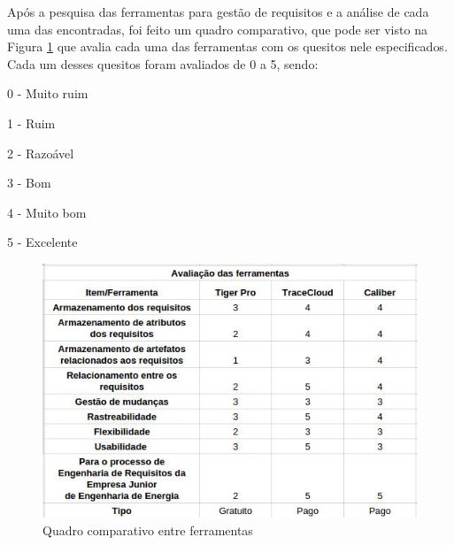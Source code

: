 Após a pesquisa das ferramentas para gestão de requisitos e a análise de cada uma das encontradas, foi feito um quadro comparativo, que pode ser visto na Figura \ref{fig:quadro} que avalia cada uma das ferramentas com os quesitos nele especificados. Cada um desses quesitos foram avaliados de 0 a 5, sendo:

0 - Muito ruim

1 - Ruim

2 - Razoável

3 - Bom

4 - Muito bom

5 - Excelente

\begin{figure}[!htb]
\centering
\includegraphics[scale=0.7]{figuras/quadro.jpg}
\caption{Quadro comparativo entre ferramentas}
\label{fig:quadro}
\end{figure}


